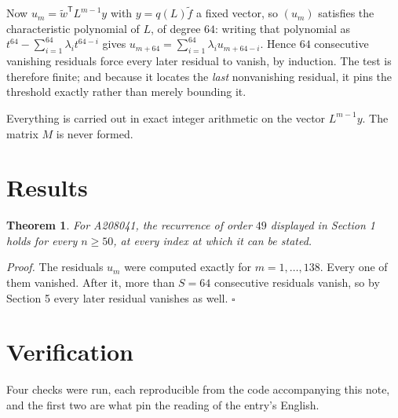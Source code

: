 \documentclass[11pt]{article}
\newtheorem{theorem}{Theorem}
\theoremstyle{definition}
\begin{document}
Now $u_m = \tilde w^{\mathsf T} L^{m-1} y$ with $y = q(L)\tilde f$ a fixed vector, so $(u_m)$ satisfies the characteristic polynomial of $L$, of degree $64$: writing that polynomial as $t^{64} - \sum_{i=1}^{64} \lambda_i t^{64-i}$ gives $u_{m+64} = \sum_{i=1}^{64} \lambda_i u_{m+64-i}$. Hence $64$ consecutive vanishing residuals force every later residual to vanish, by induction. The test is therefore finite; and because it locates the {\itshape last} nonvanishing residual, it pins the threshold exactly rather than merely bounding it.

Everything is carried out in exact integer arithmetic on the vector $L^{m-1}y$. The matrix $M$ is never formed.

\section{Results}

\begin{theorem} For A208041, the recurrence of order $49$ displayed in Section 1 holds for every $n \ge 50$, at every index at which it can be stated.\end{theorem}

{\itshape Proof.} The residuals $u_m$ were computed exactly for $m = 1,\dots,138$. Every one of them vanished. After it, more than $S = 64$ consecutive residuals vanish, so by Section 5 every later residual vanishes as well. $\square$

\section{Verification}

Four checks were run, each reproducible from the code accompanying this note, and the first two are what pin the reading of the entry's English.
\end{document}
